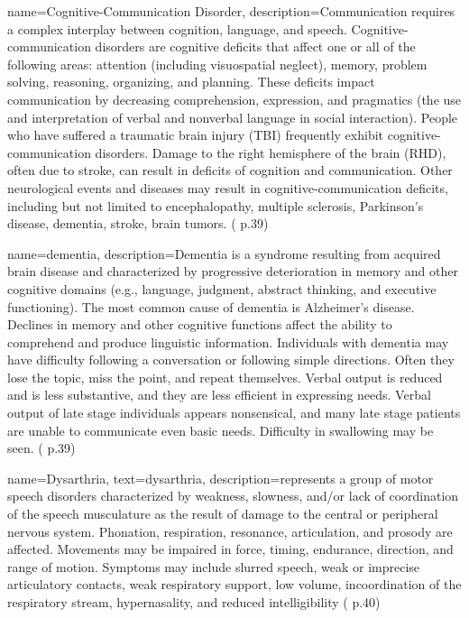 
 {
	name={Cognitive-Communication Disorder}, 
	description={Communication requires a complex interplay between cognition, language, and speech. Cognitive-communication disorders are cognitive deficits that affect one or all of the following areas: attention (including visuospatial neglect), memory, problem solving, reasoning, organizing, and planning. These deficits impact communication by decreasing comprehension, expression, and pragmatics (the use and interpretation of verbal and nonverbal language in social interaction). People who have suffered a traumatic brain injury (TBI) frequently exhibit cognitive-communication disorders. Damage to the right hemisphere of the brain (RHD), often due to stroke, can result in deficits of cognition and communication. Other neurological events and diseases may result in cognitive-communication deficits, including but not limited to encephalopathy, multiple sclerosis, Parkinson’s disease, dementia, stroke, brain tumors. (\cite{SLPathologies} p.39)
}
}

 {
	name={dementia}, 
	description={Dementia is a syndrome resulting from acquired brain disease and characterized by progressive deterioration in memory and other cognitive domains (e.g., language, judgment, abstract thinking, and executive functioning). The most common cause of dementia is Alzheimer's disease. Declines in memory and other cognitive functions affect the ability to comprehend and produce linguistic information. Individuals with dementia may have difficulty following a conversation or following simple directions. Often they lose the topic, miss the point, and repeat themselves. Verbal output is reduced and is less substantive, and they are less efficient in expressing needs. Verbal output of late stage individuals appears nonsensical, and many late stage patients are unable to communicate even basic needs. Difficulty in swallowing may be seen. (\cite{SLPathologies} p.39)
}
}

 {
	name={Dysarthria}, 
	text={dysarthria},
	description={represents a group of motor speech disorders characterized by weakness, slowness, and/or lack of coordination of the speech musculature as the result of damage to the central or peripheral nervous system. Phonation, respiration, resonance, articulation, and prosody are affected. Movements may be impaired in force, timing, endurance, direction, and range of motion. Symptoms may include slurred speech, weak or imprecise articulatory contacts, weak respiratory support, low volume, incoordination of the respiratory stream, hypernasality, and reduced intelligibility (\cite{SLPathologies} p.40)
}
}

